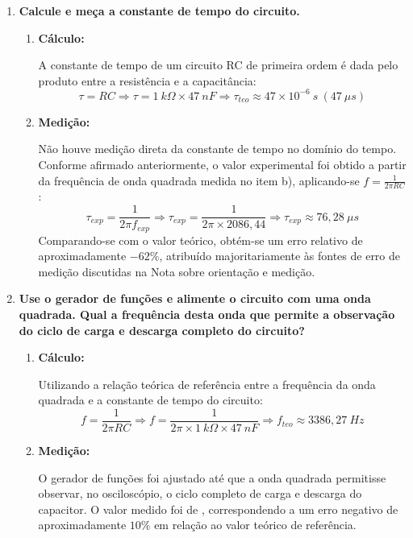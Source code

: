 \documentclass[a4paper,oneside,10pt]{article}
\begin{document}
\begin{enumerate}[label=\alph*]
\item \textbf{Calcule e meça a constante de tempo do circuito.}
\begin{enumerate}
	\item \textbf{Cálculo:}
	
	A constante de tempo de um circuito RC de primeira ordem é dada pelo produto entre a resistência e a capacitância:
	$$\tau = RC \Rightarrow \tau = 1\ k\Omega \times 47\ nF \Rightarrow \boxed{\tau_{teo} \approx 47\times 10^{-6}\ s\ (47\ \mu s)}$$
	
	\item \textbf{Medição:}
	
	Não houve medição direta da constante de tempo no domínio do tempo. Conforme afirmado anteriormente, o valor experimental foi obtido a partir da frequência de onda quadrada medida no item b), aplicando-se $f = \frac{1}{2\pi RC}$:
	$$\tau_{exp} = \frac{1}{2\pi f_{exp}} \Rightarrow \tau_{exp} = \frac{1}{2\pi \times 2086,44} \Rightarrow \boxed{\tau_{exp} \approx 76,28\ \mu s}$$
	Comparando-se com o valor teórico, obtém-se um erro relativo de aproximadamente $-62\%$, atribuído majoritariamente às fontes de erro de medição discutidas na Nota sobre orientação e medição.
	
\end{enumerate}

\item \textbf{Use o gerador de funções e alimente o circuito com uma onda quadrada. Qual a frequência desta onda que permite a observação do ciclo de carga e descarga completo do circuito?}
\begin{enumerate}
	\item \textbf{Cálculo:}
	
	Utilizando a relação teórica de referência entre a frequência da onda quadrada e a constante de tempo do circuito:
	$$f = \frac{1}{2\pi RC} \Rightarrow f = \frac{1}{2\pi \times 1\ k\Omega \times 47\ nF} \Rightarrow \boxed{f_{teo} \approx 3386,27\ Hz}$$
	
	\item \textbf{Medição:}
	
	O gerador de funções foi ajustado até que a onda quadrada permitisse observar, no osciloscópio, o ciclo completo de carga e descarga do capacitor. O valor medido foi de , correspondendo a um erro negativo de aproximadamente $10\%$ em relação ao valor teórico de referência.
	
\end{enumerate}

\end{enumerate}
\end{document}
